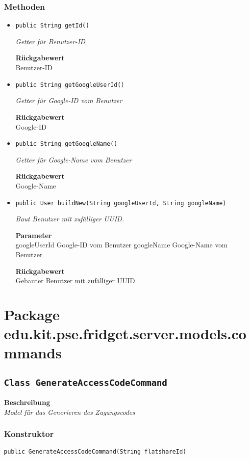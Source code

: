     \subsubsection*{Methoden}
    \begin{itemize}
    	\item{\texttt{public String getId()}}
    	
    	\textit{Getter für Benutzer-ID}
    	
    	
    	
    	\textbf{Rückgabewert} \\
    	Benutzer-ID        \item{\texttt{public String getGoogleUserId()}}
    	
    	\textit{Getter für Google-ID vom Benutzer}
    	
    	
    	
    	\textbf{Rückgabewert} \\
    	Google-ID        \item{\texttt{public String getGoogleName()}}
    	
    	\textit{Getter für Google-Name vom Benutzer}
    	
    	
    	
    	\textbf{Rückgabewert} \\
    	Google-Name        \item{\texttt{public User buildNew(String googleUserId, String googleName)}}
    	
    	\textit{Baut Benutzer mit zufälliger UUID.}
    	
    	\textbf{Parameter} \\
    	googleUserId Google-ID vom Benutzer
    	googleName Google-Name vom Benutzer
    	
    	\textbf{Rückgabewert} \\
    	Gebauter Benutzer mit zufälliger UUID
    \end{itemize}
    \section{Package edu.kit.pse.fridget.server.models.commands}
    \subsection{\texttt{Class GenerateAccessCodeCommand}}
    \textbf{Beschreibung} \\
    \textit{Model für das Generieren des Zugangscodes}
    \subsubsection*{Konstruktor}
    \texttt{public GenerateAccessCodeCommand(String flatshareId)}
